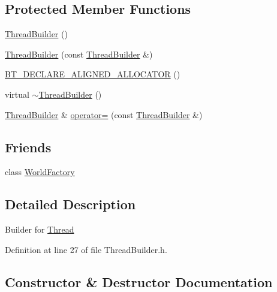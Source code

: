 \subsection*{Protected Member Functions}
\begin{DoxyCompactItemize}
\item 
\mbox{\hyperlink{classnjli_1_1_thread_builder_a9227bab7e740e9493bc07a7fbfd705ff}{Thread\+Builder}} ()
\item 
\mbox{\hyperlink{classnjli_1_1_thread_builder_a887f0a70d7ad02680d18fa7d60300f8b}{Thread\+Builder}} (const \mbox{\hyperlink{classnjli_1_1_thread_builder}{Thread\+Builder}} \&)
\item 
\mbox{\hyperlink{classnjli_1_1_thread_builder_af26adc22112326d0e02b78f5aa52b3a8}{B\+T\+\_\+\+D\+E\+C\+L\+A\+R\+E\+\_\+\+A\+L\+I\+G\+N\+E\+D\+\_\+\+A\+L\+L\+O\+C\+A\+T\+OR}} ()
\item 
virtual \mbox{\hyperlink{classnjli_1_1_thread_builder_ad9458b68332b469230ed9f58095d94bb}{$\sim$\+Thread\+Builder}} ()
\item 
\mbox{\hyperlink{classnjli_1_1_thread_builder}{Thread\+Builder}} \& \mbox{\hyperlink{classnjli_1_1_thread_builder_af415f719c34b3251f66a2de69a7456ac}{operator=}} (const \mbox{\hyperlink{classnjli_1_1_thread_builder}{Thread\+Builder}} \&)
\end{DoxyCompactItemize}
\subsection*{Friends}
\begin{DoxyCompactItemize}
\item 
class \mbox{\hyperlink{classnjli_1_1_thread_builder_acb96ebb09abe8f2a37a915a842babfac}{World\+Factory}}
\end{DoxyCompactItemize}


\subsection{Detailed Description}
Builder for \mbox{\hyperlink{classnjli_1_1_thread}{Thread}} 

Definition at line 27 of file Thread\+Builder.\+h.



\subsection{Constructor \& Destructor Documentation}
\mbox{\label{classnjli_1_1_thread_builder_a9227bab7e740e9493bc07a7fbfd705ff}} 
